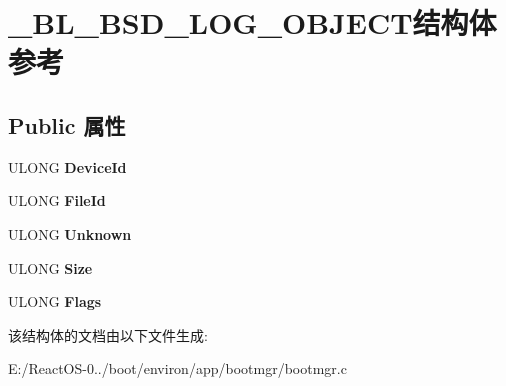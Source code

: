 \hypertarget{struct___b_l___b_s_d___l_o_g___o_b_j_e_c_t}{}\section{\+\_\+\+B\+L\+\_\+\+B\+S\+D\+\_\+\+L\+O\+G\+\_\+\+O\+B\+J\+E\+C\+T结构体 参考}
\label{struct___b_l___b_s_d___l_o_g___o_b_j_e_c_t}
\subsection*{Public 属性}
\begin{DoxyCompactItemize}
\item 
\mbox{\label{struct___b_l___b_s_d___l_o_g___o_b_j_e_c_t_afb4fe4b2e23624e06fea5e3ac5cc7392}} 
U\+L\+O\+NG {\bfseries Device\+Id}
\item 
\mbox{\label{struct___b_l___b_s_d___l_o_g___o_b_j_e_c_t_acec9e6f5a6c0f096dc8fd562bb17f347}} 
U\+L\+O\+NG {\bfseries File\+Id}
\item 
\mbox{\label{struct___b_l___b_s_d___l_o_g___o_b_j_e_c_t_a1d1987b5bfac32dd2c2dc8d323babb24}} 
U\+L\+O\+NG {\bfseries Unknown}
\item 
\mbox{\label{struct___b_l___b_s_d___l_o_g___o_b_j_e_c_t_af6fc34bc582e6ed441c02bc3fdd53a24}} 
U\+L\+O\+NG {\bfseries Size}
\item 
\mbox{\label{struct___b_l___b_s_d___l_o_g___o_b_j_e_c_t_ab0ed9625b675ff9ab53f857fba5acfac}} 
U\+L\+O\+NG {\bfseries Flags}
\end{DoxyCompactItemize}


该结构体的文档由以下文件生成\+:\begin{DoxyCompactItemize}
\item 
E\+:/\+React\+O\+S-\/0../boot/environ/app/bootmgr/bootmgr.\+c\end{DoxyCompactItemize}
